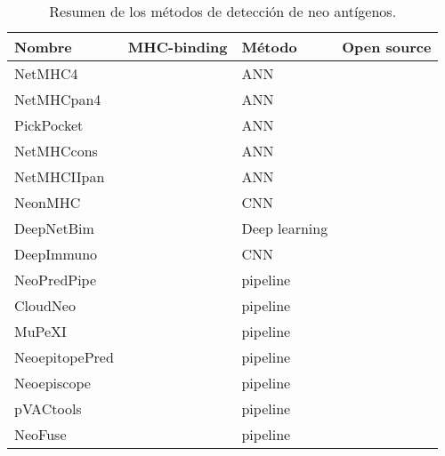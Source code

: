 \begin{table}[H]
	\centering
	\caption{Resumen de los métodos de detección de neo antígenos.}
	\label{tab:review}
	\begin{tabular}{llll}
		\hline
		\textbf{Nombre} & \textbf{MHC-binding} & \textbf{Método} & \textbf{Open source} \\ \hline
		NetMHC4         & \checkmark            & ANN             &                      \\
		NetMHCpan4      & \checkmark            & ANN             &                      \\
		PickPocket      & \checkmark            & ANN             &                      \\
		NetMHCcons      & \checkmark            & ANN             &                      \\
		NetMHCIIpan     & \checkmark            & ANN             &                      \\
		NeonMHC         & \checkmark            & CNN             &                      \\
		DeepNetBim      & \checkmark            & Deep learning   & \checkmark            \\
		DeepImmuno      & \checkmark            & CNN             &                      \\
		NeoPredPipe     &                      & pipeline        & \checkmark            \\
		CloudNeo        &                      & pipeline        &                      \\
		MuPeXI          &                      & pipeline        &                      \\
		NeoepitopePred  &                      & pipeline        &                      \\
		Neoepiscope     &                      & pipeline        &                      \\
		pVACtools       &                      & pipeline        & \checkmark            \\
		NeoFuse         &                      & pipeline        & \checkmark    \\   \hline    
	\end{tabular}
\end{table}





